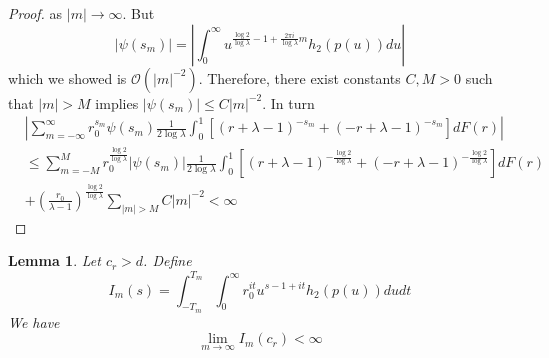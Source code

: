 \documentclass{article}
\newtheorem{lemma}{Lemma}
\newcommand{\tti}{\rightarrow\infty}
\newcommand{\bigO}[1]{\mathcal{O}\left(#1\right)}
\begin{document}
\begin{proof}
    as $|m|\tti$. But
    \begin{equation}
        |\psi(s_m)| = \left|\int_0^{\infty} u^{\frac{\log 2}{\log \lambda}-1+\frac{2\pi i}{\log \lambda}m} h_2(p(u))du\right|
    \end{equation}
    which we showed is $\bigO{|m|^{-2}}$. Therefore, there exist constants $C, M>0$ such that $|m| > M$ implies $|\psi(s_m)| \leq C|m|^{-2}$. In turn
    \begin{align}
       & \left|\sum_{m=-\infty}^{\infty} r_0^{s_m}\psi(s_m)\frac{1}{2\log\lambda}\int_0^1 \left[(r+\lambda-1)^{-s_m} + (-r+\lambda-1)^{-s_m}\right] dF(r)\right| \nonumber \\ &\leq \sum_{m=-M}^M r_0^{\frac{\log 2}{\log \lambda}}|\psi(s_m)|\frac{1}{2\log\lambda}\int_0^1 \left[(r+\lambda-1)^{-\frac{\log 2}{\log \lambda}} + (-r+\lambda-1)^{-\frac{\log 2}{\log \lambda}}\right] dF(r) \nonumber \\ &+ \left(\frac{r_0}{\lambda-1}\right)^{\frac{\log 2}{\log \lambda}}\sum_{|m| > M} C|m|^{-2}
        < \infty
    \end{align}
\end{proof}

\begin{lemma}
    \label{thm:final_finiite_bound}
    Let $c_r > d$. Define
    \begin{equation}
        I_m(s) = \int_{-T_m}^{T_m}\int_0^\infty r_0^{it}u^{s-1+it}h_2(p(u))dudt
    \end{equation}
    We have
    \begin{equation}
        \lim_{m\tti} I_m(c_r) < \infty
    \end{equation}
\end{lemma}
\end{document}
